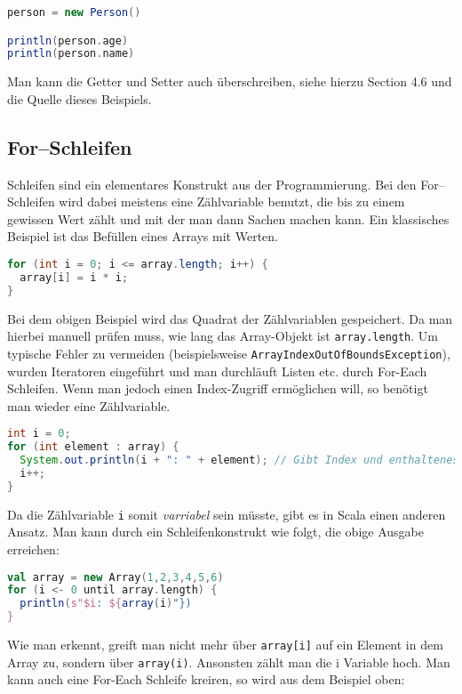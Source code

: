 \begin{lstlisting}[language=Scala]
person = new Person()

println(person.age)
println(person.name)
\end{lstlisting}

Man kann die Getter und Setter auch überschreiben, siehe hierzu \cite{ScalaCookbook} Section 4.6 und die Quelle dieses Beispiels.

\subsection{For--Schleifen}

Schleifen sind ein elementares Konstrukt aus der Programmierung. Bei den For--Schleifen wird dabei meistens eine Zählvariable benutzt, die bis zu einem gewissen Wert zählt und mit der man dann Sachen machen kann. Ein klassisches Beispiel ist das Befüllen eines Arrays mit Werten.

\begin{lstlisting}[language=Java,caption=Typische For--Schleife aus der Java Programmierung]
for (int i = 0; i <= array.length; i++) {
  array[i] = i * i;
}
\end{lstlisting}

Bei dem obigen Beispiel wird das Quadrat der Zählvariablen gespeichert. Da man hierbei manuell prüfen muss, wie lang das Array-Objekt ist \texttt{array.length}. Um typische Fehler zu vermeiden (beispielsweise \texttt{ArrayIndexOutOfBoundsException}), wurden Iteratoren eingeführt und man durchläuft Listen etc. durch For-Each Schleifen. Wenn man jedoch einen Index-Zugriff ermöglichen will, so benötigt man wieder eine Zählvariable.

\begin{lstlisting}[language=Java]
int i = 0;
for (int element : array) {
  System.out.println(i + ": " + element); // Gibt Index und enthaltenes Element aus
  i++;
}
\end{lstlisting}

Da die Zählvariable \texttt{i} somit \textit{varriabel} sein müsste, gibt es in Scala einen anderen Ansatz. Man kann durch ein Schleifenkonstrukt wie folgt, die obige Ausgabe erreichen:

\begin{lstlisting}[language=Scala]
val array = new Array(1,2,3,4,5,6)
for (i <- 0 until array.length) {
  println(s"$i: ${array(i)"})
}
\end{lstlisting}

Wie man erkennt, greift man nicht mehr über \texttt{array[i]} auf ein Element in dem Array zu, sondern über \texttt{array(i)}. Ansonsten zählt man die i Variable hoch. Man kann auch eine For-Each Schleife kreiren, so wird aus dem Beispiel oben:

